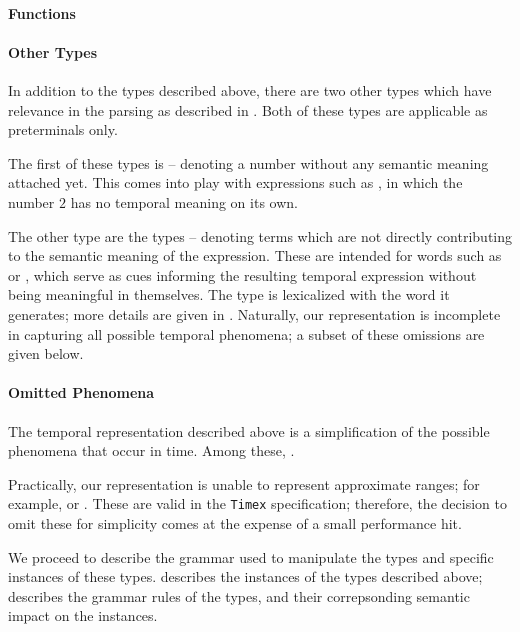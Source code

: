 \paragraph{Functions}
\dome

\paragraph{Other Types}
In addition to the types described above, there are two other types which
	have relevance in the parsing as described in .
Both of these types are applicable as preterminals only.

The first of these types is  -- denoting a number without
	any semantic meaning attached yet.
This comes into play with expressions such as , in which
	the number $2$ has no temporal meaning on its own.

The other type are the  types -- denoting terms which are not
	directly contributing to the semantic meaning of the expression.
These are intended for words such as  or , which serve as cues
	informing the resulting temporal expression without being meaningful
	in themselves.
The  type is lexicalized with the word it generates; more details
	are given in .
Naturally, our representation is incomplete in capturing all possible
	temporal phenomena; a subset of these omissions are given below.


\paragraph{Omitted Phenomena}
The temporal representation described above is a simplification of the
	possible phenomena that occur in time.
Among these, .

Practically, our representation is unable to represent approximate ranges;
	for example,  or .
These are valid in the \texttt{Timex} specification; therefore, the decision
	to omit these for simplicity comes at the expense of a small performance hit.

We proceed to describe the grammar used to manipulate the types and specific
	instances of these types.
 describes the instances of the types described
	above;  describes the grammar rules of the types,
	and their correpsonding semantic impact on the instances.


